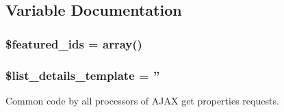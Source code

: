 \subsection{Variable Documentation}
\hypertarget{properties__util_8php_a26690c08bd8e16d48f58a724c53981e7}{
\subsubsection[{\$featured\_\-ids}]{\setlength{\rightskip}{0pt plus 5cm}\$featured\_\-ids = array()}}
\label{dd/dcf/properties__util_8php_a26690c08bd8e16d48f58a724c53981e7}
\hypertarget{properties__util_8php_af18ec572060e88a3c3ac49d4a518aa5f}{
\subsubsection[{\$list\_\-details\_\-template}]{\setlength{\rightskip}{0pt plus 5cm}\$list\_\-details\_\-template = ''}}
\label{dd/dcf/properties__util_8php_af18ec572060e88a3c3ac49d4a518aa5f}


Common code by all processors of AJAX get properties requests. 

